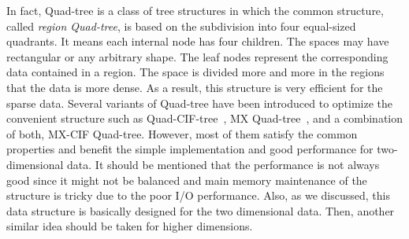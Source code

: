 \documentclass[a4paper,12pt]{article}
\begin{document}
In fact, Quad-tree is a class of tree structures in which the common structure, called \textit{region Quad-tree}, is based on the subdivision into four equal-sized quadrants. It means each internal node has four children. The spaces may have rectangular or any arbitrary shape. The leaf nodes represent the corresponding data contained in a region. The space is divided more and more in the regions that the data is more dense. As a result, this structure is very efficient for the sparse data.
Several variants of Quad-tree have been introduced to optimize the convenient structure such as Quad-CIF-tree~\cite{quadcif}, MX Quad-tree~\cite{quadmx}, and a combination of both, MX-CIF Quad-tree. However, most of them satisfy the common properties and benefit the simple implementation and good performance for two-dimensional data.
It should be mentioned that the performance is not always good since it might not be balanced and main memory maintenance of the structure is tricky due to the poor I/O performance.  Also, as we discussed, this data structure is basically designed for the two dimensional data. Then, another similar idea should be taken for higher dimensions.
\end{document}
